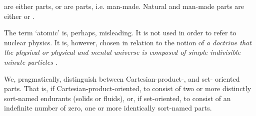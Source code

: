 
\noindent
{}
\mnewfoil
\begynd
\pind \ysf{}  are
\begynd
\pind either  parts, or are
\pind {} parts, i.e. man-made.
\afslut
\pind Natural and man-made parts are either
\begynd
\pind {} or
\pind {}.
\afslut
\afslut
\mnewfoil
      
\label{sec:Atomic Parts}

\begynd
\pind The term `atomic' is, perhaps, misleading.
\begynd
\pind It is not used in order to refer to nuclear physics.
\pind It is, however, chosen in relation to the notion of
\begynd
\pind \sl a doctrine that the physical or physical and mental universe 
\pind is composed of simple indivisible minute particles \rm\merriam.
\afslut
\afslut
\afslut


\mnewfoil


\mnewfoil
{}

\noindent
{}

\mnewfoil%

\label{sec:Compound Parts}

\begynd
\pind We, pragmatically, distinguish between
\begynd
\pind Cartesian-product-, and 
\pind set-
\afslut oriented  parts.
\pind That is, if Cartesian-product-oriented, \nyl to consist of two or more \nyl
      distinctly sort-named endurants (solids or fluids),
\pind or, if set-oriented, \nyl to consist of an indefinite number of zero,
      one or more \nyl identically sort-named parts.
\afslut

\mnewfoil

